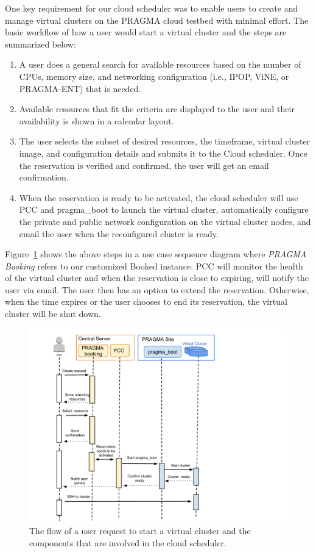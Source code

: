 \documentclass{acm_proc_article-sp}
\begin{document}
One key requirement for our cloud scheduler was to enable users to create and manage virtual clusters on the PRAGMA cloud testbed with minimal effort. 
The basic workflow of how a user would start a virtual cluster and the steps are summarized below:

\begin{enumerate}
\item A user does a general search for available resources based on the number of CPUs, memory size, and networking configuration (i.e., IPOP, ViNE, or PRAGMA-ENT) that is needed.  
\item Available resources that fit the criteria are displayed to the user and their availability is shown in a calendar layout.  
\item The user selects the subset of  desired resources, the timeframe, virtual cluster image, and configuration details and submits it to the Cloud scheduler.  Once the reservation is verified and confirmed, the user will get an email confirmation.  
\item When the reservation is ready to be activated, the cloud scheduler will use PCC and pragma\_boot to launch the virtual cluster, automatically configure the private and public network configuration on the virtual cluster nodes, and email the user when the reconfigured cluster is ready.   
\end{enumerate}

Figure~\ref{Fig:Flow} shows the above steps in a use case sequence diagram where \textit{PRAGMA Booking} refers to our customized Booked instance.  PCC will monitor the health of the virtual cluster and when the reservation is close to expiring, will notify the user via email. The user then has an option to extend the reservation.  Otherwise, when the time expires or the user chooses to end its reservation, the virtual cluster will be shut down.

\begin{figure}[htbp]
\begin{center}
\includegraphics[width=\columnwidth]{figures/flow.pdf}
\caption{The flow of a user request to start a virtual cluster and the components that are involved in the cloud scheduler.}
\label{Fig:Flow}
\end{center}
\end{figure}
\end{document}
